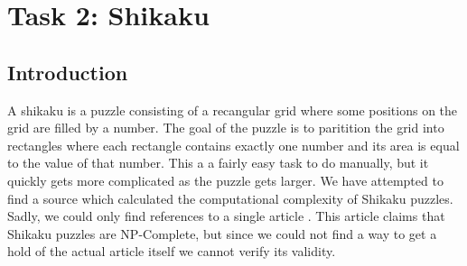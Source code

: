 \section{Task 2: Shikaku}\label{sec:shikaku}
\subsection{Introduction}

A shikaku is a puzzle consisting of a recangular grid where some positions on the grid are filled by a number. The goal of the puzzle is to paritition the grid into rectangles where each rectangle contains exactly one number and its area is equal to the value of that number. This a a fairly easy task to do manually, but it quickly gets more complicated as the puzzle gets larger. We have attempted to find a source which calculated the computational complexity of Shikaku puzzles. Sadly, we could only find references to a single article \cite{Takenaga}. This article claims that Shikaku puzzles are NP-Complete, but since we could not find a way to get a hold of the actual article itself we cannot verify its validity. \\





